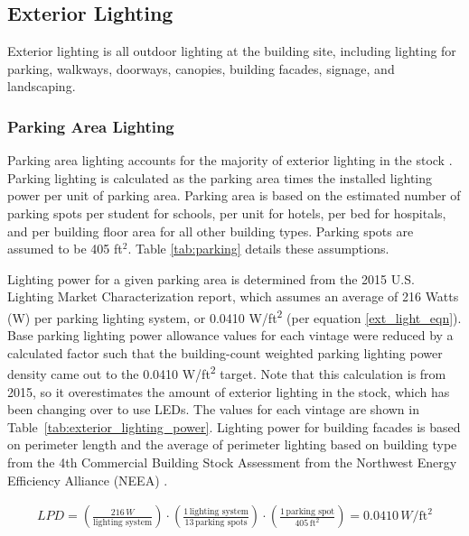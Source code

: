 \subsection{Exterior Lighting}
Exterior lighting is all outdoor lighting at the building site, including lighting for parking, walkways, doorways, canopies, building facades, signage, and landscaping.

\subsubsection{Parking Area Lighting}
Parking area lighting accounts for the majority of exterior lighting in the stock \citep{doe2015lmc}. Parking lighting is calculated as the parking area times the installed lighting power per unit of parking area. Parking area is based on the estimated number of parking spots per student for schools, per unit for hotels, per bed for hospitals, and per building floor area for all other building types.  Parking spots are assumed to be 405 ft$^2$. Table \ref{tab:parking} details these assumptions.

Lighting power for a given parking area is determined from the 2015 U.S. Lighting Market Characterization report, which assumes an average of 216 Watts (W) per parking lighting system, or 0.0410 W/ft\textsuperscript{2} (per equation \ref{ext_light_eqn}). Base parking lighting power allowance values for each vintage were reduced by a calculated factor such that the building-count weighted parking lighting power density came out to the 0.0410 W/ft\textsuperscript{2} target.  Note that this calculation is from 2015, so it overestimates the amount of exterior lighting in the stock, which has been changing over to use LEDs. The values for each vintage are shown in Table~\ref{tab:exterior_lighting_power}.
Lighting power for building facades is based on perimeter length and the average of perimeter lighting based on building type from the 4th Commercial Building Stock Assessment from the Northwest Energy Efficiency Alliance (NEEA) \citep{neea2019cbsa}.

\begin{align}
\label{ext_light_eqn}
LPD = \left(\frac{216\,W}{\text{lighting system}}\right) \cdot \left(\frac{1\,\text{lighting system}}{13\,\text{parking spots}}\right) \cdot \left(\frac{1\,\text{parking spot}}{405\,\text{ft}^2}\right) = 0.0410\,W/\text{ft}^2
\end{align}


